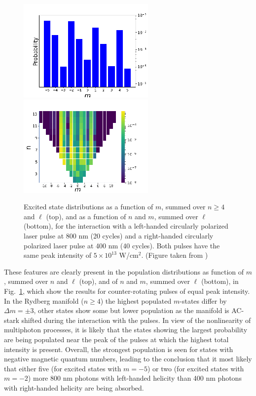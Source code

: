 \begin{figure}[!ht]
\centering
\includegraphics[width=0.49\columnwidth]{figs/Rydberg/Gebre-bicircular-Fig8a.png}
\includegraphics[width=0.49\columnwidth]{figs/Rydberg/Gebre-bicircular-Fig8b.png}
\caption{\label{fig:nm-counter-distribution}
Excited state distributions as a function of $m$, summed over $n \ge 4$ and $\ell$ (top), and as a function of $n$ and $m$, summed over $\ell$ (bottom), for the interaction with a left-handed circularly polarized laser pulse at 800 nm (20 cycles) and a right-handed circularly polarized laser pulse at 400 nm (40 cycles). Both pulses have the same peak intensity of $5 \times 10^{13}$ W/cm$^2$. (Figure taken from \cite{venzke2020_ryd})
}
\end{figure}

These features are clearly present in the population distributions as function of $m$, summed over $n$ and $\ell$ (top), and of $n$ and $m$, summed over $\ell$ (bottom), in Fig.\ \ref{fig:nm-counter-distribution}, which show the results for counter-rotating pulses of equal peak intensity. In the Rydberg manifold ($n \ge 4$) the highest populated $m$-states differ by $\Delta m = \pm 3$, other states show some but lower population as the manifold is AC-stark shifted during the interaction with the pulses. In view of the nonlinearity of multiphoton processes, it is likely that the states showing the largest probability are being populated near the peak of the pulses at which the highest total intensity is present. Overall, the strongest population is seen for states with negative magnetic quantum numbers, leading to the conclusion that it most likely that either five (for excited states with $m = -5$) or two (for excited states with $m = -2$) more 800 nm photons with left-handed helicity than 400 nm photons with right-handed helicity are being absorbed.    


